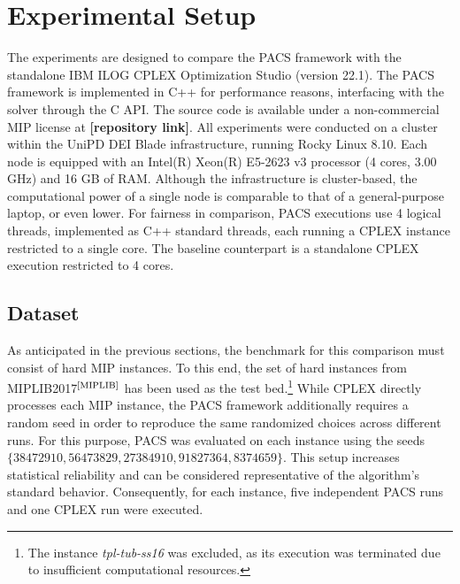 \section{Experimental Setup}
The experiments are designed to compare the PACS framework with the standalone IBM ILOG CPLEX Optimization Studio (version 22.1).  
The PACS framework is implemented in C++ for performance reasons, interfacing with the solver through the C API. The source code is available under a non-commercial MIP license at \textbf{[repository link]}.  
All experiments were conducted on a cluster within the UniPD DEI Blade infrastructure, running Rocky Linux 8.10. Each node is equipped with an Intel(R) Xeon(R) E5-2623 v3 processor (4 cores, 3.00 GHz) and 16 GB of RAM. Although the infrastructure is cluster-based, the computational power of a single node is comparable to that of a general-purpose laptop, or even lower.  
For fairness in comparison, PACS executions use 4 logical threads, implemented as C++ standard threads, each running a CPLEX instance restricted to a single core. The baseline counterpart is a standalone CPLEX execution restricted to 4 cores.

\subsection{Dataset}
As anticipated in the previous sections, the benchmark for this comparison must consist of hard MIP instances. To this end, the set of hard instances from MIPLIB2017$^\text{\cite{MIPLIB}}$ has been used as the test bed.\footnote{The instance \textit{tpl-tub-ss16} was excluded, as its execution was terminated due to insufficient computational resources.}  
While CPLEX directly processes each MIP instance, the PACS framework additionally requires a random seed in order to reproduce the same randomized choices across different runs. For this purpose, PACS was evaluated on each instance using the seeds $\{38472910, 56473829, 27384910, 91827364, 8374659\}$. This setup increases statistical reliability and can be considered representative of the algorithm’s standard behavior.  
Consequently, for each instance, five independent PACS runs and one CPLEX run were executed.

